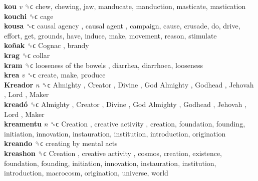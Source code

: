 \textbf{kou} \emph{v}  ␝ϲ  chew, chewing, jaw, manducate, manduction, masticate, mastication  \\
\textbf{kouchi} ␝ϲ  cage  \\
\textbf{kousa} ␝ϲ   causal agency ,  causal agent , campaign, cause, crusade, do, drive, effort, get, grounds, have, induce, make, movement, reason, stimulate  \\
\textbf{koñak} ␝ϲ   Cognac , brandy  \\
\textbf{krag} ␝ϲ  collar  \\
\textbf{kram} ␝ϲ   looseness of the bowels , diarrhea, diarrhoea, looseness  \\
\textbf{krea} \emph{v}  ␝ϲ  create, make, produce  \\
\textbf{Kreador} \emph{n}  ␝ϲ   Almighty ,  Creator ,  Divine ,  God Almighty ,  Godhead ,  Jehovah ,  Lord ,  Maker   \\
\textbf{kreadó} ␝ϲ   Almighty ,  Creator ,  Divine ,  God Almighty ,  Godhead ,  Jehovah ,  Lord ,  Maker   \\
\textbf{kreamentu} \emph{n}  ␝ϲ   Creation ,  creative activity , creation, foundation, founding, initiation, innovation, instauration, institution, introduction, origination  \\
\textbf{kreando} ␝ϲ   creating by mental acts   \\
\textbf{kreashon} ␝ϲ   Creation ,  creative activity , cosmos, creation, existence, foundation, founding, initiation, innovation, instauration, institution, introduction, macrocosm, origination, universe, world  \\
